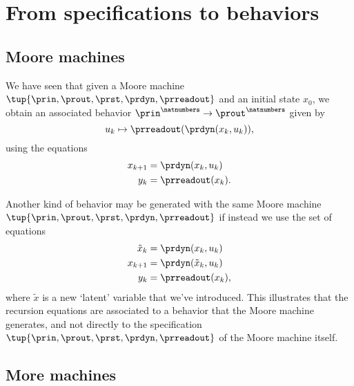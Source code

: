 


\section{From specifications to behaviors}


\subsection{Moore machines}

We have seen that given a Moore machine $\tup{\prin, \prout, \prst, \prdyn, \prreadout}$ and an initial state $x_0$, we obtain an associated behavior $\prin^\natnumbers \to  \prout^\natnumbers$ given by 
\begin{equation}
u_k \mapsto \prreadout(\prdyn(x_k, u_k)), 
\end{equation}
using the equations
\begin{align}
x_{k+1} &= \prdyn(x_k, u_k) \\
y_{k} &= \prreadout(x_{k}).
\end{align}

\begin{remark}
Another kind of behavior may be generated with the same Moore machine $\tup{\prin, \prout, \prst, \prdyn, \prreadout}$ if instead we use the set of equations
\begin{align}
\tilde x_{k} &= \prdyn(x_k, u_k) \\
x_{k+1} &= \prdyn(\tilde x_{k}, u_k) \\
y_{k} &= \prreadout(x_{k}),
\end{align}
where $\tilde x$ is a new `latent' variable that we've introduced. This illustrates that the recursion equations are associated to a behavior that the Moore machine generates, and not directly to the specification $\tup{\prin, \prout, \prst, \prdyn, \prreadout}$ of the Moore machine itself. 
\end{remark}

\subsection{More machines}



